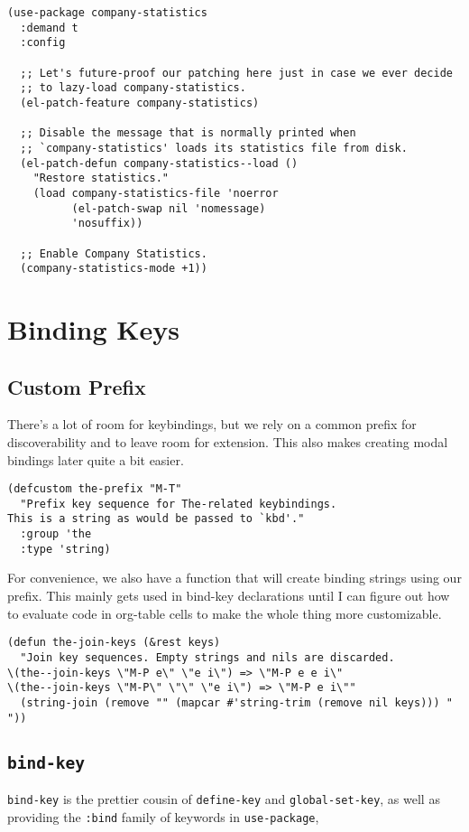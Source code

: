 \documentclass[11pt]{article}
\begin{document}
\begin{verbatim}
(use-package company-statistics
  :demand t
  :config

  ;; Let's future-proof our patching here just in case we ever decide
  ;; to lazy-load company-statistics.
  (el-patch-feature company-statistics)

  ;; Disable the message that is normally printed when
  ;; `company-statistics' loads its statistics file from disk.
  (el-patch-defun company-statistics--load ()
    "Restore statistics."
    (load company-statistics-file 'noerror
          (el-patch-swap nil 'nomessage)
          'nosuffix))

  ;; Enable Company Statistics.
  (company-statistics-mode +1))
\end{verbatim}
\section{Binding Keys}
\label{sec:org1bbe8c2}

\subsection{Custom Prefix}
\label{sec:orgd165ada}
There's a lot of room for keybindings, but we rely on a common prefix
for discoverability and to leave room for extension. This also makes
creating modal bindings later quite a bit easier.

\begin{verbatim}
(defcustom the-prefix "M-T"
  "Prefix key sequence for The-related keybindings.
This is a string as would be passed to `kbd'."
  :group 'the
  :type 'string)
\end{verbatim}

For convenience, we also have a function that will create binding
strings using our prefix. This mainly gets used in bind-key
declarations until I can figure out how to evaluate code in org-table
cells to make the whole thing more customizable.

\begin{verbatim}
(defun the-join-keys (&rest keys)
  "Join key sequences. Empty strings and nils are discarded.
\(the--join-keys \"M-P e\" \"e i\") => \"M-P e e i\"
\(the--join-keys \"M-P\" \"\" \"e i\") => \"M-P e i\""
  (string-join (remove "" (mapcar #'string-trim (remove nil keys))) " "))
\end{verbatim}


\subsection{\texttt{bind-key}}
\label{sec:orga173d2a}
\texttt{bind-key} is the prettier cousin of \texttt{define-key} and
\texttt{global-set-key}, as well as providing the \texttt{:bind} family of keywords
in \texttt{use-package},
\end{document}
